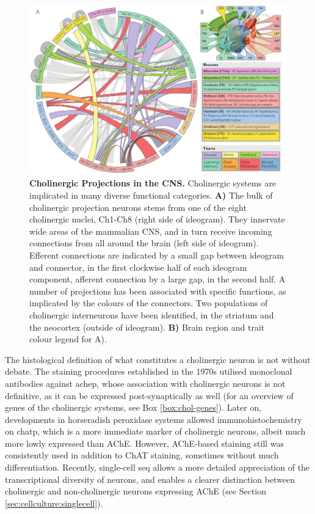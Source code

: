 \begin{figure}
\includegraphics[width=\textwidth]{figures/projections}
\caption[Cholinergic Projections.]{\textbf{Cholinergic Projections in the CNS.} Cholinergic systems are implicated in many diverse functional categories. \textbf{A)} The bulk of cholinergic projection neurons stems from one of the eight cholinergic nuclei, Ch1-Ch8 (right side of ideogram). They innervate wide areas of the mammalian CNS, and in turn receive incoming connections from all around the brain (left side of ideogram). Efferent connections are indicated by a small gap between ideogram and connector, in the first clockwise half of each ideogram component, afferent connection by a large gap, in the second half. A number of projections has been associated with specific functions, as implicated by the colours of the connectors. Two populations of cholinergic interneurons have been identified, in the striatum and the neocortex (outside of ideogram). \textbf{B)} Brain region and trait colour legend for A).
\label{fig:projections}}
\end{figure}

The histological definition of what constitutes a cholinergic neuron is not without debate. The staining procedures established in the 1970s utilised monoclonal antibodies against \ac{achep}\cite{Mesulam1976}, whose association with cholinergic neurons is not definitive, as it can be expressed post-synaptically as well (for an overview of genes of the cholinergic systems, see Box \ref{box:chol-genes}). Later on, developments in horseradish peroxidase systems allowed immunohistochemistry on \ac{chatp}, which is a more immediate marker of cholinergic neurons\cite{Mesulam1984}, albeit much more lowly expressed than AChE. However, AChE-based staining still was consistently used in addition to ChAT staining\cite{Mesulam1988}, sometimes without much differentiation. Recently, single-cell \ac{seq} allows a more detailed appreciation of the transcriptional diversity of neurons, and enables a clearer distinction between cholinergic and non-cholinergic neurons expressing AChE (see Section \ref{sec:cellculture:singlecell}).

